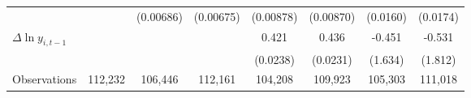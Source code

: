 {\begin{tabular}{l*{7}{c}}
          &                  &(0.00686)         &(0.00675)         &(0.00878)         &(0.00870)         & (0.0160)         & (0.0174)         \\
[1em]
$\Delta \ln y_{i,t-1}$&                  &                  &                  &    0.421\sym{***}&    0.436\sym{***}&   -0.451         &   -0.531         \\
          &                  &                  &                  & (0.0238)         & (0.0231)         &  (1.634)         &  (1.812)         \\
\hline
Observations&  112,232         &  106,446         &  112,161         &  104,208         &  109,923         &  105,303         &  111,018         \\
\hline\hline
\end{tabular}
}
